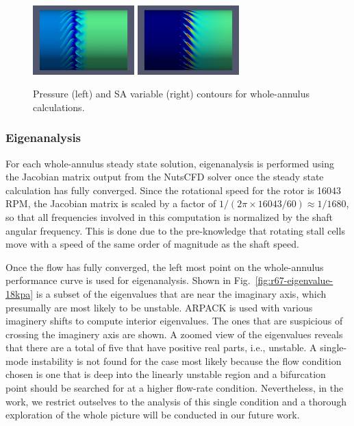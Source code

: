 \documentclass[journal,final]{new-aiaa}
\begin{document}
\begin{figure}[htb]
	\centering   
	\includegraphics[width=0.35\textwidth]{pic/pressure-22passage.jpeg}
	\includegraphics[width=0.35\textwidth]{pic/sa-22passage.jpeg}
	\caption{Pressure (left) and SA variable (right) contours for
	whole-annulus calculations.}
	\label{fig:r67-flow}
\end{figure}

\subsubsection{Eigenanalysis}

For each whole-annulus steady state solution, eigenanalysis
is performed using the Jacobian matrix output from the NutsCFD solver
once the steady state calculation has fully converged.
Since the rotational speed for the rotor is 16043 RPM, the Jacobian
matrix is scaled by a factor of $1/(2\pi \times 16043 / 60)\approx 1/1680$,
so that all frequencies involved in this computation is normalized by the
shaft angular frequency. This is done due to the pre-knowledge that
rotating stall cells move with a speed of the same order of magnitude
as the shaft speed.

Once the flow has fully converged, the left most point on the whole-annulus
performance curve is used for eigenanalysis.
Shown in Fig.~\ref{fig:r67-eigenvalue-18kpa} is a subset of the eigenvalues
that are near the imaginary axis, which presumally are most likely to
be unstable. ARPACK is used with various imaginery shifts to compute
interior eigenvalues. The ones that are suspicious of crossing the
imaginery axis are shown. A zoomed view of the eigenvalues reveals
that there are a total of five that have positive real parts, i.e., unstable.
A single-mode instability is not found for the case most likely because
the flow condition chosen is one that is deep into the linearly unstable
region and a bifurcation point should be searched for at a higher flow-rate
condition. Nevertheless, in the work, we restrict outselves to the analysis
of this single condition and a thorough exploration of the whole picture will
be conducted in our future work.
\end{document}

